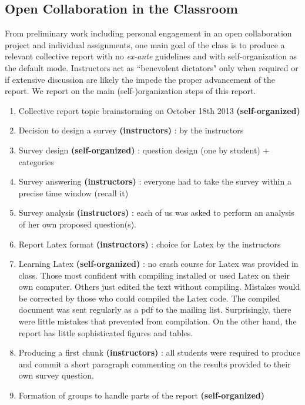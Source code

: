 \subsection{Open Collaboration in the Classroom}
\label{opencollaborationintheclassroom}

From preliminary work including personal engagement in an open collaboration project and individual assignments, one main goal of the class is to produce a relevant collective report with no {\it ex-ante} guidelines and with self-organization as the default mode. Instructors act as ``benevolent dictators" only when required or if extensive discussion are likely the impede the proper advancement of the report. We report on the main (self-)organization steps of this report.

\begin{enumerate}
  \item Collective report topic brainstorming on October 18th 2013 {\bf (self-organized)}
  \item Decision to design a survey {\bf (instructors)} : by the instructors
  \item Survey design {\bf (self-organized)} : question design (one by student) + categories
  \item Survey answering {\bf (instructors)} : everyone had to take the survey within a precise time window (recall it)
  \item Survey analysis {\bf (instructors)} :  each of us was asked to perform an analysis of her own proposed question(s).
  \item Report Latex format {\bf (instructors)} : choice for Latex by the instructors
  \item Learning Latex {\bf (self-organized)} : no crash course for Latex was provided in class. Those most confident with compiling installed or used Latex on their own computer. Others just edited the text without compiling. Mistakes would be corrected by those who could compiled the Latex code. The compiled document was sent regularly as a pdf to the mailing list. Surprisingly, there were little mistakes that prevented from compilation. On the other hand, the report has little sophisticated figures and tables.
  \item Producing a first chunk {\bf (instructors)} : all students were required to produce and commit a short paragraph commenting on the results provided to their own survey question.  
  \item Formation of groups to handle parts of the report {\bf (self-organized)} 

\end{enumerate}
